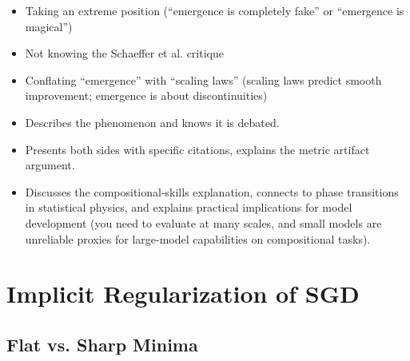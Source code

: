 \begin{interviewq}
\redflags
\begin{itemize}
    \item Taking an extreme position (``emergence is completely fake'' or ``emergence is magical'')
    \item Not knowing the Schaeffer et al. critique
    \item Conflating ``emergence'' with ``scaling laws'' (scaling laws predict smooth improvement; emergence is about discontinuities)
\end{itemize}


\goodgreat
\begin{itemize}
    \item {} Describes the phenomenon and knows it is debated.
    \item {} Presents both sides with specific citations, explains the metric artifact argument.
    \item {} Discusses the compositional-skills explanation, connects to phase transitions in statistical physics, and explains practical implications for model development (you need to evaluate at many scales, and small models are unreliable proxies for large-model capabilities on compositional tasks).
\end{itemize}

\end{interviewq}

\section{Implicit Regularization of SGD}
\label{sec:implicit_reg}

\subsection{Flat vs. Sharp Minima}

